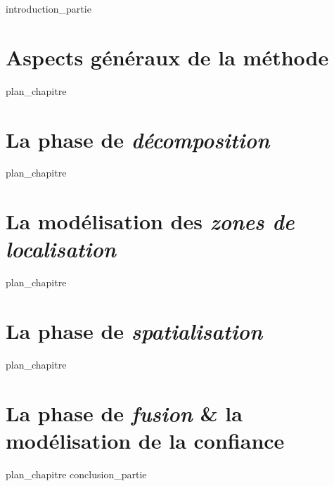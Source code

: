 \label{part:02_int}
{introduction_partie}
%
\chapter{Aspects généraux de la méthode }
\label{chap:04}
{plan_chapitre}
%
\chapter{La phase de \emph{décomposition} }
\label{chap:05}
{plan_chapitre}
%
\chapter{La modélisation des \emph{zones de localisation}}
\label{chap:06}
{plan_chapitre}
%
\chapter{La phase de \emph{spatialisation} }
\label{chap:07}
{plan_chapitre}
%
\chapter{La phase de \emph{fusion} \& la modélisation de la confiance
  }
\label{chap:08}
{plan_chapitre}
%
\label{part:02_cnc}
{conclusion_partie}
